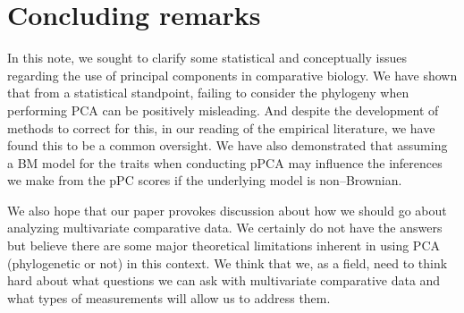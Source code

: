 \documentclass[a4paper,12pt]{article}
\begin{document}
\section{Concluding remarks}
In this note, we sought to clarify some statistical and conceptually issues regarding the use of principal components in comparative biology. We have shown that from a statistical standpoint, failing to consider the phylogeny when performing PCA can be positively misleading. And despite the development of methods to correct for this, in our reading of the empirical literature, we have found this to be a common oversight. We have also demonstrated that assuming a BM model for the traits when conducting pPCA may influence the inferences we make from the pPC scores if the underlying model is non--Brownian. 

We also hope that our paper provokes discussion about how we should go about analyzing multivariate comparative data. We certainly do not have the answers but believe there are some major theoretical limitations inherent in using PCA (phylogenetic or not) in this context. We think that we, as a field, need to think hard about what questions we can ask with multivariate comparative data and what types of measurements will allow us to address them.

\newpage


\end{document}
